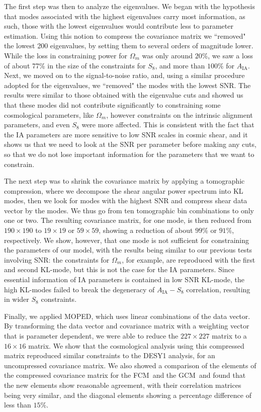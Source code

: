 \documentclass[aps, prd, twocolumn, superscriptaddress, nofootinbib, amssymb, amsmath]{revtex4-2}
\newcommand\full{the FCM}
\newcommand\gaussian{the GCM}
\begin{document}
The first step was then to analyze the eigenvalues. We began with the hypothesis that modes associated with the highest eigenvalues carry most information, as such, those with the lowest eigenvalues would contribute less to parameter estimation. Using this notion to compress the covariance matrix we ``removed" the lowest 200 eigenvalues, by setting them to several orders of magnitude lower. While the loss in constraining power for $\Omega_m$ was only around $20\%$, we saw a loss of about 77\% in the size of the constraints for $S_8$, and more than $100\%$ for $A_{\text{IA}}$. Next, we moved on to the signal-to-noise ratio, and, using a similar procedure adopted for the eigenvalues, we ``removed" the modes with the lowest SNR. The results were similar to those obtained with the eigenvalue cuts and showed us that these modes did not contribute significantly to constraining some cosmological parameters, like $\Omega_m$, however constraints on the intrinsic alignment parameters, and even $S_8$ were more affected. This is consistent with the fact that the IA parameters are more sensitive to low SNR scales in cosmic shear, and it shows us that we need to look at the SNR per parameter before making any cuts, so that we do not lose important information for the parameters that we want to constrain.

The next step was to shrink the covariance matrix by applying a tomographic compression, where we decompose the shear angular power spectrum into KL modes, then we look for modes with the highest SNR and compress shear data vector by the modes. We thus go from ten tomographic bin combinations to only one or two. The resulting covariance matrix, for one mode, is then reduced from $190 \times 190$ to $19 \times 19$ or $59 \times 59$, showing a reduction of about $99\%$ or $91\%$, respectively. We show, however, that one mode is not sufficient for constraining the parameters of our model, with the results being similar to our previous tests involving SNR: the constraints for $\Omega_m$, for example, are reproduced with the first and second KL-mode, but this is not the case for the IA parameters. Since essential information of IA parameters is contained in low SNR KL-mode, the high KL-modes failed to break the degeneracy of $A_{\text{IA}}-S_8$ correlation, resulting in wider $S_8$ constraints. 

Finally, we applied MOPED, which uses linear combinations of the data vector. By transforming the data vector and covariance matrix with a weighting vector that is parameter dependent, we were able to reduce the $227 \times 227$ matrix to a $16 \times 16$ matrix.
We show that the cosmological analysis using this compressed matrix reproduced similar constraints to the DESY1 analysis, for an uncompressed covariance matrix. We also showed a comparison of the elements of the compressed covariance matrix for \full\ and \gaussian\ and found that the new elements show reasonable agreement, with their correlation matrices being very similar, and the diagonal elements showing a percentage difference of less than $15\%$.
\end{document}
